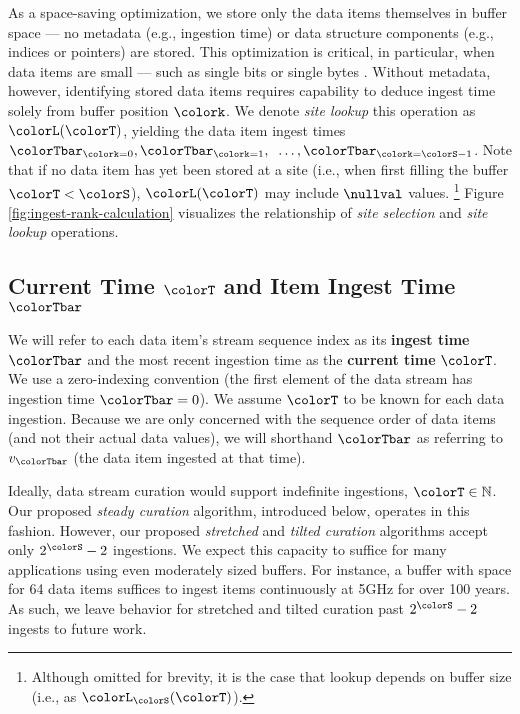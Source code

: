 As a space-saving optimization, we store only the data items themselves in buffer space --- no metadata (e.g., ingestion time) or data structure components (e.g., indices or pointers) are stored.
This optimization is critical, in particular, when data items are small --- such as single bits or single bytes \citep{moreno2022hereditary}.
Without metadata, however, identifying stored data items requires capability to deduce ingest time solely from buffer position $\colork$.
We denote \textit{site lookup} this operation as $\colorL(\colorT)$, yielding the data item ingest times $\colorTbar_{\colork=0}, \colorTbar_{\colork=1}, \;\;\ldots, \colorTbar_{\colork=\colorS-1}$.
Note that if no data item has yet been stored at a site (i.e., when first filling the buffer $\colorT < \colorS$), $\colorL(\colorT)$ may include $\nullval$ values.%
\footnote{%
Although omitted for brevity, it is the case that lookup depends on buffer size (i.e., as $\colorL_{\colorS}(\colorT)$).
}
Figure \ref{fig:ingest-rank-calculation} visualizes the relationship of \textit{site selection} and \textit{site lookup} operations.

\subsection{Current Time $\colorT$ and Item Ingest Time $\colorTbar$}
\label{sec:notation-time}

We will refer to each data item's stream sequence index as its \textbf{ingest time} $\colorTbar$ and the most recent ingestion time as the \textbf{current time} $\colorT$.
We use a zero-indexing convention (the first element of the data stream has ingestion time $\colorTbar=0$).
We assume $\colorT$ to be known for each data ingestion.
Because we are only concerned with the sequence order of data items (and not their actual data values), we will shorthand $\colorTbar$ as referring to $v_{\colorTbar}$ (the data item ingested at that time).

Ideally, data stream curation would support indefinite ingestions, $\colorT \in \mathbb{N}$.
Our proposed \textit{steady curation} algorithm, introduced below, operates in this fashion.
However, our proposed \textit{stretched} and \textit{tilted curation} algorithms accept only $2^{\colorS} - 2$ ingestions.
We expect this capacity to suffice for many applications using even moderately sized buffers.
For instance, a buffer with space for 64 data items suffices to ingest items continuously at 5GHz for over 100 years.
As such, we leave behavior for stretched and tilted curation past $2^{\colorS} - 2$ ingests to future work.

